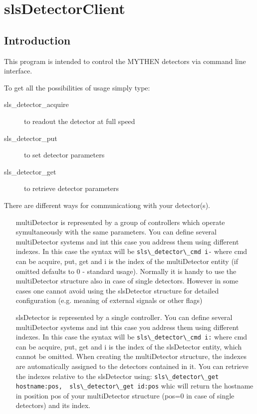 \documentclass{report}
\begin{document}
\chapter{slsDetectorClient}

\section{Introduction}

This program is intended to control the MYTHEN detectors via command line interface.

To get all the possibilities of usage simply type:
\begin{description}
\item[sls\_detector\_acquire] to readout the detector at full speed
\item[sls\_detector\_put] to set detector parameters
\item[sls\_detector\_get] to retrieve detector parameters
\end{description}

There are different ways for communicationg with your detector(s).
\begin{itemize}
\item[multiDetector] is represented by a group of controllers which operate symultaneously with the same parameters. You can define several multiDetector systems and int this case you address them using different indexes. In this case the syntax will be  \verb=sls\_detector\_cmd i-= where cmd can be acquire, put, get and i is the index of the multiDetector entity (if omitted defaults to 0 -  standard usage). Normally it is handy to use the multiDetector structure also in case of single detectors. However in some cases one cannot avoid using the slsDetector structure for detailed configuration (e.g. meaning of external signals or other flags)
\item[slsDetector] is represented by a single controller. You can define several multiDetector systems and int this case you address them using different indexes. In this case the syntax will be  \verb=sls\_detector\_cmd i:= where cmd can be acquire, put, get and i is the index of the slsDetector entity, which cannot be omitted. When creating the multiDetector structure, the indexes are automatically assigned to the detectors contained in it. You can retrieve the indexes relative to the slsDetector using: \verb=sls\_detector\_get hostname:pos,  sls\_detector\_get id:pos= whic will return the hostname in position pos of your multiDetector structure (pos=0 in case of single detectors) and its index.
\end{itemize}
\end{document}
